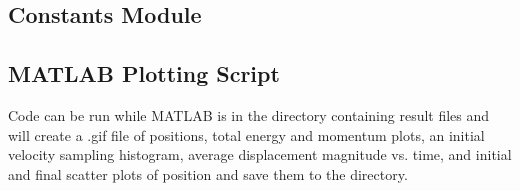 \documentclass[12pt]{article}
\begin{document}
\subsection*{Constants Module}

\subsection*{MATLAB Plotting Script}
Code can be run while MATLAB is in the directory containing result files and will create a .gif file of positions, total energy and momentum plots, an initial velocity sampling histogram, average displacement magnitude vs. time, and initial and final scatter plots of position and save them to the directory.

\end{document}
